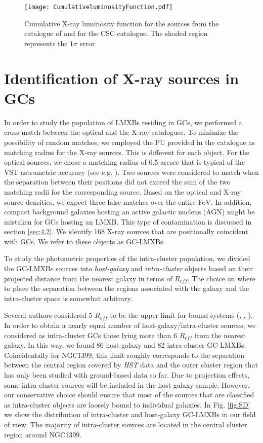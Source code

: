 \documentclass{aa}
\begin{document}
\begin{figure}
    \centering
    \texttt{[image: CumulativeluminosityFunction.pdf]}
    \caption{Cumulative X-ray luminosity function for the sources from the catalogue of \cite{Jin2019} and for the CSC catalogue. The shaded region represents the $1\sigma$ error.}
    \label{fig:compareX}
\end{figure}


 
 \section{Identification of X-ray sources in GCs}
 \label{Sec:3}
In order to study the population of LMXBs residing in GCs, we performed a cross-match between the optical and the X-ray catalogues. To minimize the possibility of random matches, we employed the PU provided in the \cite{Jin2019} catalogue as matching radius for the X-ray
sources. This is different for each object. For the optical sources, we chose a matching radius of 0.5 arcsec that is typical of the VST astrometric accuracy (see e.g. \citealt{Capaccioli2015}). Two sources were considered to match when the separation between their positions did not exceed the sum of the two matching radii for the corresponding source. Based on the optical and X-ray source densities, we expect three false matches over the entire FoV. In addition, compact background galaxies hosting an active galactic nucleus (AGN) might be mistaken for GCs hosting an LMXB. This type of contamination is discussed in section \ref{sec:4.2}.
We identify 168 X-ray sources that are positionally coincident with GCs. We refer to these objects as GC-LMXBs.
 
 To study the photometric properties of the intra-cluster population, we divided the GC-LMXBs sources into \textit{host-galaxy} and \textit{intra-cluster} objects based on their projected distance from the nearest galaxy in terms of $R_{eff}$. 
 The choice on where to place the separation between the regions associated with the galaxy and the intra-cluster space is somewhat arbitrary. 

Several authors considered 5 $R_{eff}$ to be the upper limit for bound systems (\citealt{Kartha2014}, \citealt{Forbes2017}, \citealt{Caso2019}). In order to obtain a nearly equal number of host-galaxy/intra-cluster sources, we considered as intra-cluster GCs those lying more than 6 $R_{eff}$ from the nearest galaxy. In this way, we found 86 host-galaxy and 82 intra-cluster GC-LMXBs. Coincidentally for NGC1399, this limit roughly corresponds to the separation between the central region covered by \textit{HST} data \citep{Paolillo2011} and the outer cluster region that has only been studied with ground-based data so far. Due to projection effects, some intra-cluster sources will be included in the host-galaxy sample. However, our conservative choice should ensure that most of the sources that are classified as intra-cluster objects are loosely bound to individual galaxies.  In Fig. \ref{fig:SD} we show the distribution of intra-cluster and host-galaxy GC-LMXBs in our field of view. The majority of intra-cluster sources are located in the central cluster region around NGC1399. 
\end{document}
